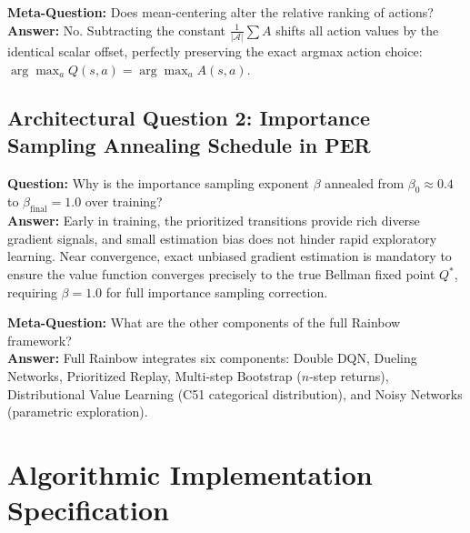 \documentclass[11pt,a4paper]{article}
\theoremstyle{definition}
\begin{document}
\textbf{Meta-Question:} Does mean-centering alter the relative ranking of actions?\\
\textbf{Answer:} No. Subtracting the constant $\frac{1}{|\mathcal{A}|}\sum A$ shifts all action values by the identical scalar offset, perfectly preserving the exact argmax action choice: $\arg\max_a Q(s, a) = \arg\max_a A(s, a)$.

\subsection{Architectural Question 2: Importance Sampling Annealing Schedule in PER}
\textbf{Question:} Why is the importance sampling exponent $\beta$ annealed from $\beta_0 \approx 0.4$ to $\beta_{\text{final}} = 1.0$ over training?\\
\textbf{Answer:} Early in training, the prioritized transitions provide rich diverse gradient signals, and small estimation bias does not hinder rapid exploratory learning. Near convergence, exact unbiased gradient estimation is mandatory to ensure the value function converges precisely to the true Bellman fixed point $Q^*$, requiring $\beta = 1.0$ for full importance sampling correction.

\textbf{Meta-Question:} What are the other components of the full Rainbow framework?\\
\textbf{Answer:} Full Rainbow integrates six components: Double DQN, Dueling Networks, Prioritized Replay, Multi-step Bootstrap ($n$-step returns), Distributional Value Learning (C51 categorical distribution), and Noisy Networks (parametric exploration).

\section{Algorithmic Implementation Specification}
\end{document}
